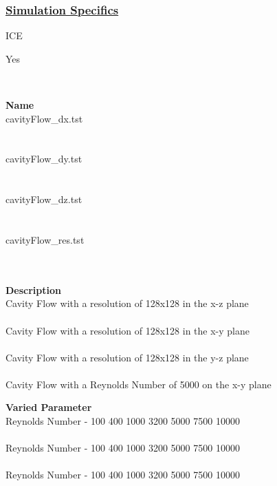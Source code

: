 \subsubsection*{\underline{Simulation Specifics}}
\begin{description} 
\footnotesize
\item [Component used:] \hfill ICE
\item [Order of Accuracy Framework:] \hfill Yes
\item [Tests to run:] \hfill \\
%
\begin{minipage}[t]{0.2\textwidth}
{\bfseries Name} \\
cavityFlow\_dx.tst \\ \\ \\
cavityFlow\_dy.tst \\ \\ \\
cavityFlow\_dz.tst \\ \\ \\
cavityFlow\_res.tst \\ \\ \\
\end{minipage}
%
\begin{minipage}[t]{0.4\textwidth}
{\bfseries Description} \\
Cavity Flow with a resolution of 128x128 in the x-z plane \\ \\
Cavity Flow with a resolution of 128x128 in the x-y plane \\ \\
Cavity Flow with a resolution of 128x128 in the y-z plane \\ \\
Cavity Flow with a Reynolds Number of 5000 on the x-y plane \\
\end{minipage}
\hfill
%
\begin{minipage}[t]{0.3\textwidth}
{\bfseries Varied Parameter} \\ 
Reynolds Number - 100 400 1000 3200 5000 7500 10000 \\ \\
Reynolds Number - 100 400 1000 3200 5000 7500 10000 \\ \\
Reynolds Number - 100 400 1000 3200 5000 7500 10000 \\ \\

\end{minipage}
\end{description}
